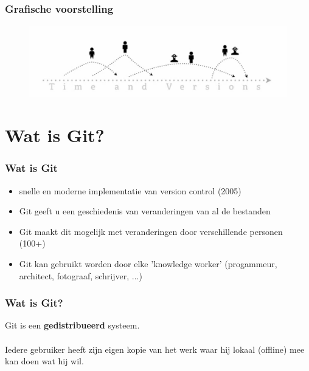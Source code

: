 \documentclass{beamer}
\begin{document}
\begin{frame}

\frametitle{Grafische voorstelling}

\begin{figure}

\includegraphics[width=350pt]{Grafiek.png}

\end{figure}

\end{frame}


\section{Wat is Git?}


\begin{frame}

\frametitle{Wat is Git}

\begin{itemize}
\item {\LARGE snelle en moderne implementatie van version control (2005)}
\item {\LARGE Git geeft u een geschiedenis van veranderingen van al de bestanden}
\item {\LARGE Git maakt dit mogelijk met veranderingen door verschillende personen (100+)}
\item {\LARGE Git kan gebruikt worden door elke 'knowledge worker' (progammeur,  architect, fotograaf, schrijver, ...)}
\end{itemize}

\end{frame}


\begin{frame}

\frametitle{Wat is Git?}

{\LARGE Git is een {\huge \textbf{gedistribueerd}} systeem.\\~\\

Iedere gebruiker heeft zijn eigen kopie van het werk waar hij lokaal (offline) mee kan doen wat hij wil.\\~\\}

\end{frame}
\end{document}
